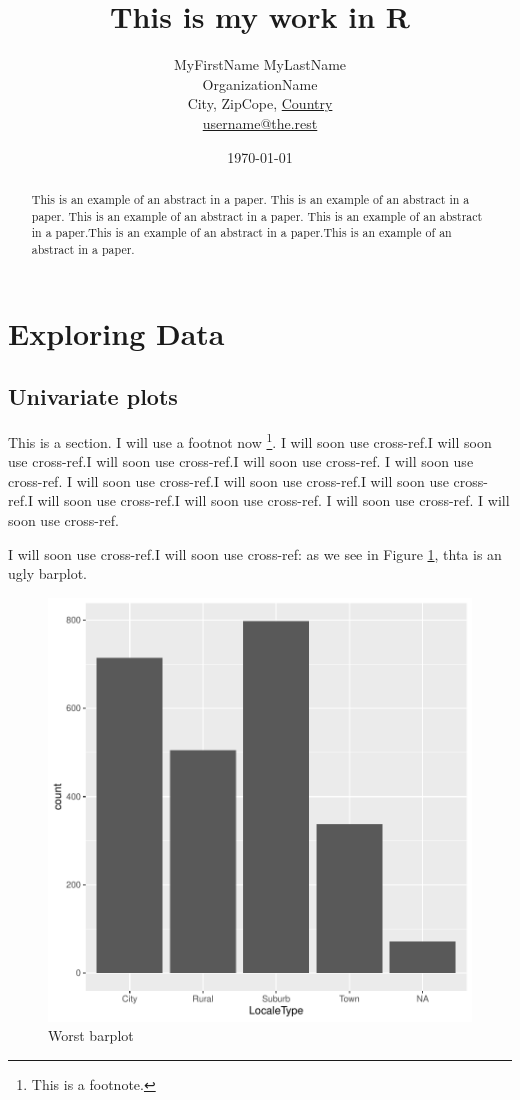 \documentclass[a4paper, 12pt]{article}
\title{This is my work in R}
\author{ MyFirstName MyLastName\\OrganizationName\\
         City, ZipCope, \underline{Country}\\
        \url{username@the.rest}}
\date{\today}  %
\begin{document}


\maketitle 
\begin{abstract}
This is an example of an abstract in a paper. This is an example of an abstract in a paper. This is an example of an abstract in a paper. This is an example of an abstract in a paper.This is an example of an abstract in a paper.This is an example of an abstract in a paper.
\end{abstract}

\newpage

\section{Exploring Data}\label{explo-data} %

\subsection{Univariate plots}
This is a section. I will use a footnot now \footnote{This is a footnote.}. I will soon use cross-ref.I will soon use cross-ref.I will soon use cross-ref.I will soon use cross-ref. I will soon use cross-ref. I will soon use cross-ref.I will soon use cross-ref.I will soon use cross-ref.I will soon use cross-ref.I will soon use cross-ref. I will soon use cross-ref. I will soon use cross-ref.


I will soon use cross-ref.I will soon use cross-ref: as we see in Figure \ref{fig:theDeli_1}, thta is an ugly barplot.

\begin{figure}[h]
\centering
\includegraphics{draft_paper-theDeli_1}
\caption{Worst barplot}  %
\label{fig:theDeli_1} %
\end{figure}
\end{document}
